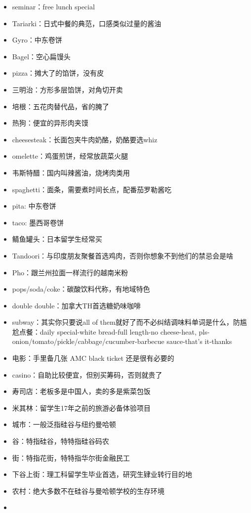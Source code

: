 \documentclass[]{tufte-book}
\begin{document}
\begin{itemize}
\item
  seminar：free lunch special
\item
  Tariarki：日式中餐的典范，口感类似过量的酱油
\item
  Gyro：中东卷饼
\item
  Bagel：空心扁馒头
\item
  pizza：摊大了的馅饼，没有皮
\item
  三明治：方形多层馅饼，对角切开卖
\item
  培根：五花肉替代品，省的腌了
\item
  热狗：便宜的异形肉夹馍
\item
  cheesesteak：长面包夹牛肉奶酪，奶酪要选whiz
\item
  omelette：鸡蛋煎饼，经常放蔬菜火腿
\item
  韦斯特醋：国内叫辣酱油，烧烤肉类用
\item
  spaghetti：面条，需要煮时间长点，配番茄罗勒酱吃
\item
  pita: 中东卷饼
\item
  taco: 墨西哥卷饼
\item
  鲭鱼罐头：日本留学生经常买
\item
  Tandoori：与印度朋友聚餐首选鸡肉，否则你想象不到他们的禁忌会是啥
\item
  Pho：跟兰州拉面一样流行的越南米粉
\item
  pops/soda/coke：碳酸饮料代称，有地域特色
\item
  double double：加拿大TH首选糖奶味咖啡
\item
  subway：其实你只要说all of them就好了而不必纠结调味料单词是什么，防尴尬点餐：daily special-white bread-full length-no cheese-heat, pls-onion/tomato/pickle/cabbage/cucumber-barbecue sauce-that's it-thanks
\item
  电影：手里备几张 AMC black ticket 还是很有必要的
\item
  casino：自助比较便宜，但别买筹码，否则就贵了
\item
  寿司店：老板多是中国人，卖的多是紫菜包饭
\item
  米其林：留学生17年之前的旅游必备体验项目
\item
  城市：一般泛指硅谷与纽约曼哈顿
\item
  谷：特指硅谷，特特指硅谷码农
\item
  街：特指花街，特特指华尔街金融民工
\item
  下谷上街：理工科留学生毕业首选，研究生肄业转行目的地
\item
  农村：绝大多数不在硅谷与曼哈顿学校的生存环境
\item

\end{itemize}
\end{document}
